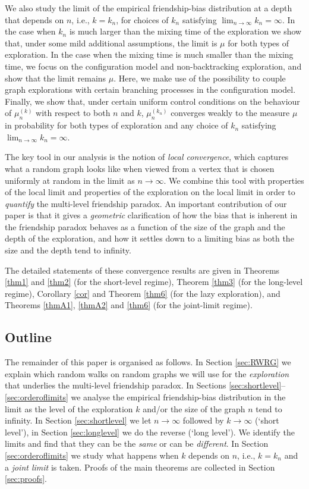 \documentclass[11pt]{article}
\numberwithin{equation}{section}
\theoremstyle{plain}
\begin{document}
We also study the limit of the empirical friendship-bias distribution at a depth that depends on $n$, i.e., $k = k_n$, for choices of $k_n$ satisfying $\lim_{n\to\infty} k_n = \infty$. In the case when $k_n$ is much larger than the mixing time of the exploration we show that, under some mild additional assumptions, the limit is $\mu$ for both types of exploration. In the case when the mixing time is much smaller than the mixing time, we focus on the configuration model and non-backtracking exploration, and show that the limit remains $\mu$. Here, we make use of the possibility to couple graph explorations with certain branching processes in the configuration model. Finally, we show that, under certain uniform control conditions on the behaviour of $\mu_n^{(k)}$ with respect to both $n$ and $k$, $\mu_n^{(k_n)}$ converges weakly to the measure $\mu$ in probability for both types of exploration and any choice of $k_n$ satisfying $\lim_{n\to\infty} k_n = \infty$. 
  
The key tool in our analysis is the notion of \emph{local convergence}, which captures what a random graph looks like when viewed from a vertex that is chosen uniformly at random in the limit as $n\to\infty$. We combine this tool with properties of the local limit and properties of the exploration on the local limit in order to \emph{quantify} the multi-level friendship paradox. An important contribution of our paper is that it gives a \emph{geometric} clarification of how the bias that is inherent in the friendship paradox behaves as a function of the size of the graph and the depth of the exploration, and how it settles down to a limiting bias as both the size and the depth tend to infinity.


The detailed statements of these convergence results are given in Theorems \ref{thm1} and \ref{thm2} (for the short-level regime), Theorem \ref{thm3} (for the long-level regime), Corollary \ref{cor} and Theorem \ref{thm6} (for the lazy exploration), and Theorems \ref{thmA1}, \ref{thmA2} and \ref{thm6} (for the joint-limit regime).

 

\subsection{Outline}

The remainder of this paper is organised as follows. In Section \ref{sec:RWRG} we explain which random walks on random graphs we will use for the \emph{exploration} that underlies the multi-level friendship paradox. In Sections \ref{sec:shortlevel}--\ref{sec:orderoflimits} we analyse the empirical friendship-bias distribution in the limit as the level of the exploration $k$ and/or the size of the graph $n$ tend to infinity. In Section \ref{sec:shortlevel} we let $n\to\infty$ followed by $k \to \infty$ (`short level'), in Section \ref{sec:longlevel} we do the reverse (`long level'). We identify the limits and find that they can be the \emph{same} or can be \emph{different}. In Section \ref{sec:orderoflimits} we study what happens when $k$ depends on $n$, i.e., $k = k_n$ and a \emph{joint limit} is taken. Proofs of the main theorems are collected in Section \ref{sec:proofs}.
\end{document}
